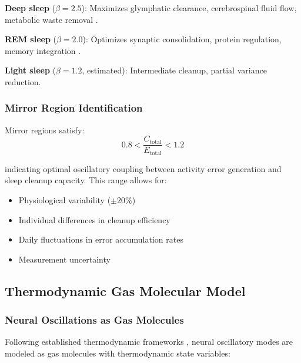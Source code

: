 \documentclass[12pt,twocolumn]{article}
\theoremstyle{remark}
\begin{document}
\textbf{Deep sleep} ($\beta = 2.5$): Maximizes glymphatic clearance, cerebrospinal fluid flow, metabolic waste removal \citep{xie2013sleep}.

\textbf{REM sleep} ($\beta = 2.0$): Optimizes synaptic consolidation, protein regulation, memory integration \citep{rasch2013about}.

\textbf{Light sleep} ($\beta = 1.2$, estimated): Intermediate cleanup, partial variance reduction.

\subsubsection{Mirror Region Identification}

Mirror regions satisfy:
\begin{equation}
0.8 < \frac{C_{\text{total}}}{E_{\text{total}}} < 1.2
\end{equation}

indicating optimal oscillatory coupling between activity error generation and sleep cleanup capacity. This range allows for:
\begin{itemize}
\item Physiological variability ($\pm 20\%$)
\item Individual differences in cleanup efficiency
\item Daily fluctuations in error accumulation rates
\item Measurement uncertainty
\end{itemize}

\subsection{Thermodynamic Gas Molecular Model}

\subsubsection{Neural Oscillations as Gas Molecules}

Following established thermodynamic frameworks \citep{friston2006free,sagawa2012thermodynamics}, neural oscillatory modes are modeled as gas molecules with thermodynamic state variables:
\end{document}
